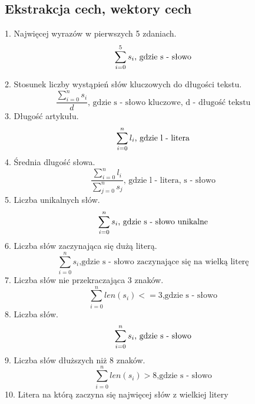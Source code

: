 \documentclass{classrep}
\begin{document}
\subsection{Ekstrakcja cech, wektory cech}
1. Najwięcej wyrazów w pierwszych 5 zdaniach.\\
\begin{displaymath}
\sum_{i = 0}^{5} s_i \textrm{, gdzie s - słowo}\\
\end{displaymath}

2. Stosunek liczby wystąpień słów kluczowych do długości tekstu.\\
\begin{displaymath}
\frac{\sum_{i=0}^{n}s_i}{d}\textrm{, gdzie s - słowo kluczowe, d - długość tekstu}
\end{displaymath}
3. Długość artykułu.\\
\begin{displaymath}
\sum_{i = 0}^{n} l_i \textrm{, gdzie l - litera}\\
\end{displaymath}
4. Średnia dlugość słowa.\\
\begin{displaymath}
\frac{\sum_{i=0}^{n}l_i}{\sum_{j=0}^{n}s_j}\textrm{, gdzie l - litera, s - słowo}
\end{displaymath}
5. Liczba unikalnych słów.\\
\begin{displaymath}
\sum_{i = 0}^{n} s_i \textrm{, gdzie s - słowo unikalne}\\
\end{displaymath}
6. Liczba słów zaczynająca się dużą literą.\\
\begin{displaymath}
\sum_{i=0}^{n}s_i \textrm{,gdzie s - słowo zaczynające się na wielką literę}
\end{displaymath}
7. Liczba słów nie przekraczająca 3 znaków.\\
\begin{displaymath}
\sum_{i=0}^{n}len(s_i)<= 3 \textrm{,gdzie s - słowo}
\end{displaymath}
8. Liczba słów.\\
\begin{displaymath}
\sum_{i = 0}^{n} s_i \textrm{, gdzie s - słowo}\\
\end{displaymath}
9. Liczba słów dłuższych niż 8 znaków.\\
\begin{displaymath}
\sum_{i=0}^{n}len(s_i) > 8 \textrm{,gdzie s - słowo}
\end{displaymath}
10. Litera na którą zaczyna się najwięcej słów z wielkiej litery \\ 
\end{document}
